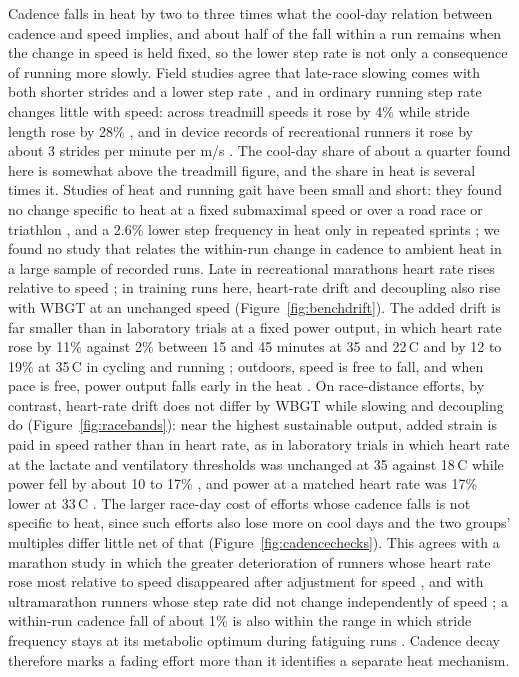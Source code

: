 \documentclass[11pt]{article}
\renewcommand{\_}{\textunderscore\allowbreak}
\begin{document}
Cadence falls in heat by two to three times what the cool-day relation between cadence and speed implies, and about half of the fall within a run remains when the change in speed is held fixed, so the lower step rate is not only a consequence of running more slowly. Field studies agree that late-race slowing comes with both shorter strides and a lower step rate \citep{hanley2020,hirakawa2026,winter2017,giovanelli2017}, and in ordinary running step rate changes little with speed: across treadmill speeds it rose by 4\% while stride length rose by 28\% \citep{cavanagh1989}, and in device records of recreational runners it rose by about 3 strides per minute per m/s \citep{vanoeveren2019}. The cool-day share of about a quarter found here is somewhat above the treadmill figure, and the share in heat is several times it. Studies of heat and running gait have been small and short: they found no change specific to heat at a fixed submaximal speed \citep{mtibaa2019,girard2017} or over a road race or triathlon \citep{dejonglempke2025,james2025}, and a 2.6\% lower step frequency in heat only in repeated sprints \citep{girard2017}; we found no study that relates the within-run change in cadence to ambient heat in a large sample of recorded runs. Late in recreational marathons heart rate rises relative to speed \citep{smyth2022,billat2020}; in training runs here, heart-rate drift and decoupling also rise with WBGT at an unchanged speed (Figure~\ref{fig:benchdrift}). The added drift is far smaller than in laboratory trials at a fixed power output, in which heart rate rose by 11\% against 2\% between 15 and 45 minutes at 35 and 22\,\textdegree C \citep{lafrenz2008} and by 12 to 19\% at 35\,\textdegree C in cycling and running \citep{wingo2005,wingo2020}; outdoors, speed is free to fall, and when pace is free, power output falls early in the heat \citep{tucker2004}. On race-distance efforts, by contrast, heart-rate drift does not differ by WBGT while slowing and decoupling do (Figure~\ref{fig:racebands}): near the highest sustainable output, added strain is paid in speed rather than in heart rate, as in laboratory trials in which heart rate at the lactate and ventilatory thresholds was unchanged at 35 against 18\,\textdegree C while power fell by about 10 to 17\% \citep{maunder2021}, and power at a matched heart rate was 17\% lower at 33\,\textdegree C \citep{charoensap2023}. The larger race-day cost of efforts whose cadence falls is not specific to heat, since such efforts also lose more on cool days and the two groups' multiples differ little net of that (Figure~\ref{fig:cadencechecks}). This agrees with a marathon study in which the greater deterioration of runners whose heart rate rose most relative to speed disappeared after adjustment for speed \citep{hunter2026b}, and with ultramarathon runners whose step rate did not change independently of speed \citep{burns2019}; a within-run cadence fall of about 1\% is also within the range in which stride frequency stays at its metabolic optimum during fatiguing runs \citep{hunter2007,vernillo2019}. Cadence decay therefore marks a fading effort more than it identifies a separate heat mechanism.
\end{document}
